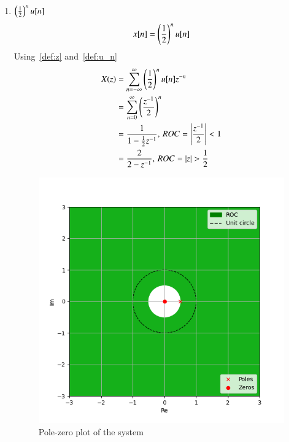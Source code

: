 \documentclass[journal,12pt,twocolumn]{IEEEtran}
\providecommand{\abs}[1]{\left\vert#1\right\vert}
\begin{document}
\begin{enumerate}[label= (\alph*)]
    \item $\left(\frac{1}{2}\right)^n u[n]$
    \begin{align}
        x[n]=\left(\frac{1}{2}\right)^n u[n]
    \end{align}
    Using~\eqref{def:z} and~\eqref{def:u_n}
    \begin{align}
        X(z)&=\sum_{n=-\infty}^{\infty} \brak{\frac{1}{2}}^n u[n]z^{-n}\\
        &=\sum_{n=0}^{\infty} \brak{\frac{z^{-1}}{2}}^n\\
        &=\frac{1}{1-\frac{1}{2}z^{-1}},\, ROC=\abs{\frac{z^{-1}}{2}} < 1\\
        &=\frac{2}{2-z^{-1}},\, ROC=\abs{z}>\frac{1}{2}
    \end{align}
    \begin{figure}[!ht]
        \centering
        \includegraphics[width=\columnwidth]{plot/a}
        \caption{Pole-zero plot of the system}
        \label{a}
    \end{figure}


\end{enumerate}
\end{document}
